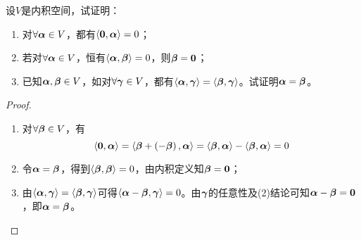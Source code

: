 \begin{problem}
设\(V\)是内积空间，试证明：
\begin{enumerate}
    \item 对\(\forall\vecal\in V\)，都有\(\indot{\veczero}{\vecal}=0\)；
    \item 若对\(\forall\vecal\in V\)，恒有\(\indot{\vecal}{\vecbeta}=0\)，则\(\vecbeta=\veczero\)；
    \item 已知\(\vecal,\vecbeta\in V\)，如对\(\forall\vecgamma\in V\)，都有\(\indot{\vecal}{\vecgamma}=\indot{\vecbeta}{\vecgamma}\)。试证明\(\vecal=\vecbeta\)。
\end{enumerate}
\end{problem}
\begin{proof}
    \begin{enumerate}
        \item {
              对\(\forall\vecbeta\in V\)，有
              \begin{equation*}
                  \indot{\veczero}{\vecal}=\indot{\vecbeta+\mypar{-\vecbeta}}{\vecal}=\indot{\vecbeta}{\vecal}-\indot{\vecbeta}{\vecal}=0
              \end{equation*}
              }
        \item 令\(\vecal=\vecbeta\)，得到\(\indot{\vecbeta}{\vecbeta}=0\)，由内积定义知\(\vecbeta=\veczero\)；
        \item 由\(\indot{\vecal}{\vecgamma}=\indot{\vecbeta}{\vecgamma}\)可得\(\indot{\vecal-\vecbeta}{\vecgamma}=0\)。由\(\vecgamma\)的任意性及(2)结论可知\(\vecal-\vecbeta=\veczero\)，即\(\vecal=\vecbeta\)。
    \end{enumerate}
\end{proof}


